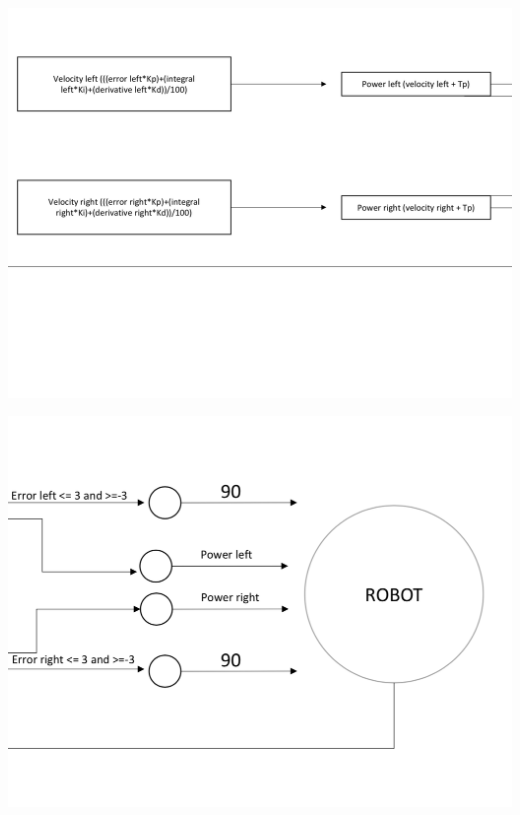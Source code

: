 \documentclass[hidelinks,a4paper,11pt]{article}
\begin{document}
\begin{mdframed}
\begin{center}
			\includegraphics[width=\textwidth]{NDA3.png}
		\end{center}
		\begin{center}
			\includegraphics[width=\textwidth]{NDA4.png}
		\end{center}
		
	\end{mdframed}
	\vspace*{\baselineskip}
	
\end{document}

